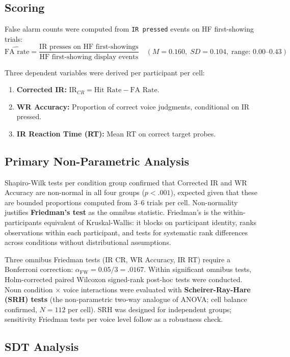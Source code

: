 \documentclass[12pt, a4paper]{article}
\begin{document}
\subsection{Scoring}

False alarm counts were computed from \texttt{IR pressed} events on HF
first-showing trials:
\[
  \widehat{\text{FA rate}} = \frac{\text{IR presses on HF first-showings}}
                                  {\text{HF first-showing display events}}
  \quad (M = 0.160,\; SD = 0.104,\; \text{range: } 0.00\text{--}0.43)
\]

Three dependent variables were derived per participant per cell:
\begin{enumerate}[nosep]
  \item \textbf{Corrected IR:} $\text{IR}_{CR} = \text{Hit Rate} - \text{FA Rate}$.
  \item \textbf{WR Accuracy:} Proportion of correct voice judgments,
  conditional on IR pressed.
  \item \textbf{IR Reaction Time (RT):} Mean RT on correct target probes.
\end{enumerate}

\subsection{Primary Non-Parametric Analysis}

Shapiro-Wilk tests per condition group confirmed that Corrected IR and
WR Accuracy are non-normal in all four groups ($p < .001$), expected
given that these are bounded proportions computed from 3--6 trials per
cell. Non-normality justifies \textbf{Friedman's test} as the omnibus
statistic. Friedman's is the within-participants equivalent of
Kruskal-Wallis: it blocks on participant identity, ranks observations
within each participant, and tests for systematic rank differences across
conditions without distributional assumptions.

Three omnibus Friedman tests (IR CR, WR Accuracy, IR RT) require a
Bonferroni correction: $\alpha_{\text{FW}} = 0.05/3 = .0167$. Within
significant omnibus tests, Holm-corrected paired Wilcoxon signed-rank
post-hoc tests were conducted. Noun condition $\times$ voice interactions
were evaluated with \textbf{Scheirer-Ray-Hare (SRH) tests} (the
non-parametric two-way analogue of ANOVA; cell balance confirmed,
$N = 112$ per cell). SRH was designed for independent groups; sensitivity
Friedman tests per voice level follow as a robustness check.

\subsection{SDT Analysis}
\end{document}
